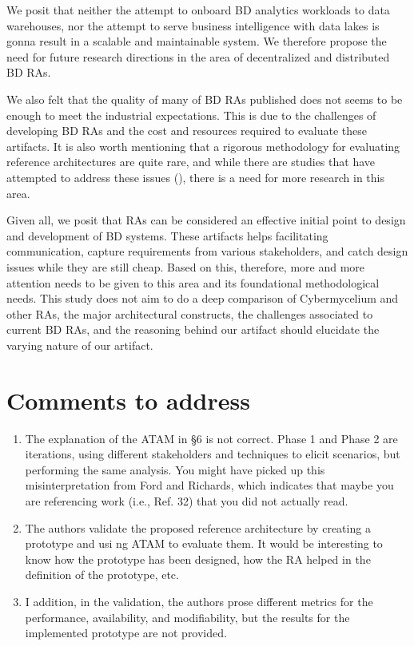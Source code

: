 \documentclass[review]{elsarticle}
\begin{document}
We posit that neither the attempt to onboard BD analytics workloads to data warehouses, nor the attempt to serve business intelligence with data lakes is gonna result in a scalable and maintainable system. We therefore propose the need for future research directions in the area of decentralized and distributed BD RAs. 

We also felt that the quality of many of BD RAs published does not seems to be enough to meet the industrial expectations. This is due to the challenges of developing BD RAs and the cost and resources required to evaluate these artifacts. It is also worth mentioning that a rigorous methodology for evaluating reference architectures are quite rare, and while there are studies that have attempted to address these issues (\cite{angelov2008towards}), there is a need for more research in this area.

Given all, we posit that RAs can be considered an effective initial point to design and development of BD systems. These artifacts helps facilitating communication, capture requirements from various stakeholders, and catch design issues while they are still cheap. Based on this, therefore, more and more attention needs to be given to this area and its foundational methodological needs. This study does not aim to do a deep comparison of Cybermycelium and other RAs, the major architectural constructs, the challenges associated to current BD RAs, and the reasoning behind our artifact should elucidate the varying nature of our artifact.


\section{Comments to address}


\begin{enumerate}

    
    \item The explanation of the ATAM in §6 is not correct. Phase 1 and Phase 2 are iterations, using different stakeholders and techniques to elicit scenarios, but performing the same analysis. You might have picked up this misinterpretation from Ford and Richards, which indicates that maybe you are referencing work (i.e., Ref. 32) that you did not actually read.
    
    \item  The authors validate the proposed reference architecture by creating a prototype and usi ng ATAM to evaluate them. It would be interesting to know how the prototype has been designed, how the RA helped in the definition of the prototype, etc.
    
    \item   I addition, in the validation, the authors prose different metrics for the performance, availability, and modifiability, but the results for the implemented prototype are not provided.

\end{enumerate}
\end{document}
